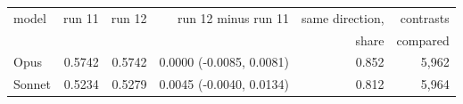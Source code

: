 \begin{tabular}{lrrrrr}
\toprule
model & run 11 & run 12 & run 12 minus run 11 & same direction, & contrasts \\
 & & & & share & compared \\
\midrule
Opus & 0.5742 & 0.5742 & 0.0000 (-0.0085, 0.0081) & 0.852 & 5,962 \\
Sonnet & 0.5234 & 0.5279 & 0.0045 (-0.0040, 0.0134) & 0.812 & 5,964 \\

\end{tabular}
